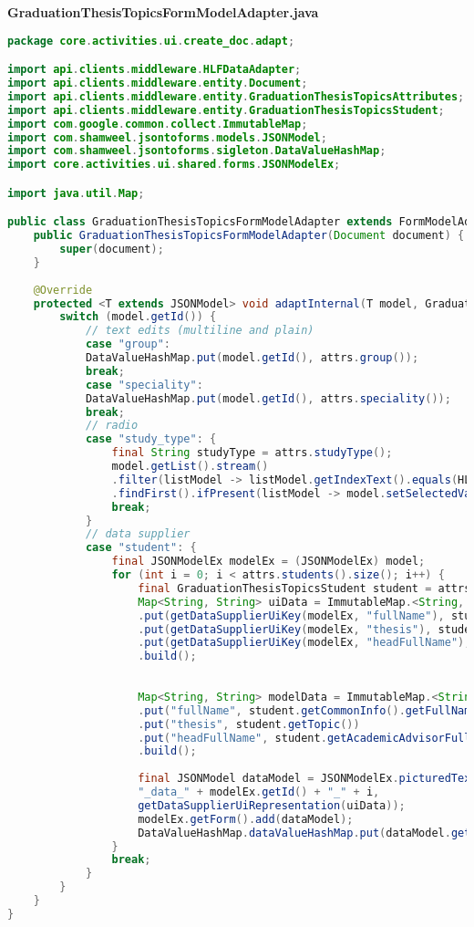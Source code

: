 \textbf{GraduationThesisTopicsFormModelAdapter.java}
\begin{lstlisting}[language=Java]
package core.activities.ui.create_doc.adapt;

import api.clients.middleware.HLFDataAdapter;
import api.clients.middleware.entity.Document;
import api.clients.middleware.entity.GraduationThesisTopicsAttributes;
import api.clients.middleware.entity.GraduationThesisTopicsStudent;
import com.google.common.collect.ImmutableMap;
import com.shamweel.jsontoforms.models.JSONModel;
import com.shamweel.jsontoforms.sigleton.DataValueHashMap;
import core.activities.ui.shared.forms.JSONModelEx;

import java.util.Map;

public class GraduationThesisTopicsFormModelAdapter extends FormModelAdapter<GraduationThesisTopicsAttributes> {
	public GraduationThesisTopicsFormModelAdapter(Document document) {
		super(document);
	}
	
	@Override
	protected <T extends JSONModel> void adaptInternal(T model, GraduationThesisTopicsAttributes attrs) {
		switch (model.getId()) {
			// text edits (multiline and plain)
			case "group":
			DataValueHashMap.put(model.getId(), attrs.group());
			break;
			case "speciality":
			DataValueHashMap.put(model.getId(), attrs.speciality());
			break;
			// radio
			case "study_type": {
				final String studyType = attrs.studyType();
				model.getList().stream()
				.filter(listModel -> listModel.getIndexText().equals(HLFDataAdapter.toUserStudyType(studyType)))
				.findFirst().ifPresent(listModel -> model.setSelectedValue(listModel.getIndex().toString()));
				break;
			}
			// data supplier
			case "student": {
				final JSONModelEx modelEx = (JSONModelEx) model;
				for (int i = 0; i < attrs.students().size(); i++) {
					final GraduationThesisTopicsStudent student = attrs.students().get(i);
					Map<String, String> uiData = ImmutableMap.<String, String>builder()
					.put(getDataSupplierUiKey(modelEx, "fullName"), student.getCommonInfo().getFullName())
					.put(getDataSupplierUiKey(modelEx, "thesis"), student.getTopic())
					.put(getDataSupplierUiKey(modelEx, "headFullName"), student.getAcademicAdvisorFullName())
					.build();
					
					
					Map<String, String> modelData = ImmutableMap.<String, String>builder()
					.put("fullName", student.getCommonInfo().getFullName())
					.put("thesis", student.getTopic())
					.put("headFullName", student.getAcademicAdvisorFullName())
					.build();
					
					final JSONModel dataModel = JSONModelEx.picturedTextView(
					"_data_" + modelEx.getId() + "_" + i,
					getDataSupplierUiRepresentation(uiData));
					modelEx.getForm().add(dataModel);
					DataValueHashMap.dataValueHashMap.put(dataModel.getId(), getDataSupplierModelRepresentation(modelData));
				}
				break;
			}
		}
	}
}

\end{lstlisting}
